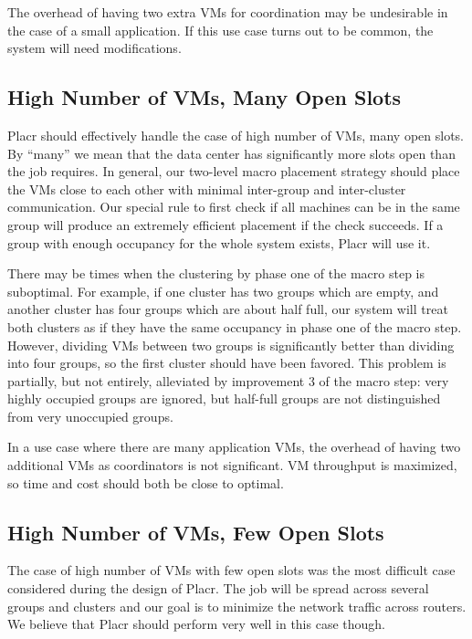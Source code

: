 \documentclass[11pt]{article}
\begin{document}
The overhead of having two extra VMs for coordination may be undesirable in the case of a small application.  If this use case turns out to be common, the system will need modifications.

\subsection{High Number of VMs, Many Open Slots}

Placr should effectively handle the case of high number of VMs, many open slots.  By ``many'' we mean that the data center has significantly more slots open than the job requires. In general, our two-level macro placement strategy should place the VMs close to each other with minimal inter-group and inter-cluster communication.  Our special rule to first check if all machines can be in the same group will produce an extremely efficient placement if the check succeeds.  If a group with enough occupancy for the whole system exists, Placr will use it.

There may be times when the clustering by phase one of the macro step is suboptimal. For example, if one cluster has two groups which are empty, and another cluster has four groups which are about half full, our system will treat both clusters as if they have the same occupancy in phase one of the macro step. However, dividing VMs between two groups is significantly better than dividing into four groups, so the first cluster should have been favored. This problem is partially, but not entirely, alleviated by improvement 3 of the macro step: very highly occupied groups are ignored, but half-full groups are not distinguished from very unoccupied groups.

In a use case where there are many application VMs, the overhead of having two additional VMs as coordinators is not significant.  VM throughput is maximized, so time and cost should both be close to optimal.


\subsection{High Number of VMs, Few Open Slots}

The case of high number of VMs with few open slots was the most difficult case considered during the design of Placr.  The job will be spread across several groups and clusters and our goal is to minimize the network traffic across routers.  We believe that Placr should perform very well in this case though.
\end{document}
